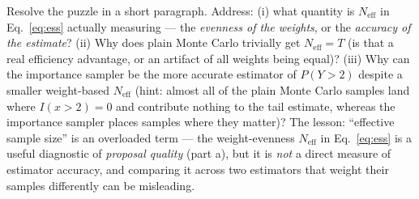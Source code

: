 \documentclass[11pt]{article}
\begin{document}
\begin{enumerate}
\begin{enumerate}
Resolve the puzzle in a short paragraph. Address: (i) what quantity is $N_{\mathrm{eff}}$ in Eq.~\eqref{eq:ess} actually measuring --- the {\em evenness of the weights}, or the {\em accuracy of the estimate}? (ii) Why does plain Monte Carlo trivially get $N_{\mathrm{eff}} = T$ (is that a real efficiency advantage, or an artifact of all weights being equal)? (iii) Why can the importance sampler be the more accurate estimator of $P(Y>2)$ despite a smaller weight-based $N_{\mathrm{eff}}$ (hint: almost all of the plain Monte Carlo samples land where $I(x>2)=0$ and contribute nothing to the tail estimate, whereas the importance sampler places samples where they matter)? The lesson: ``effective sample size'' is an overloaded term --- the weight-evenness $N_{\mathrm{eff}}$ in Eq.~\eqref{eq:ess} is a useful diagnostic of {\em proposal quality} (part a), but it is {\em not} a direct measure of estimator accuracy, and comparing it across two estimators that weight their samples differently can be misleading.
\end{enumerate}

\end{enumerate}
\end{document}
